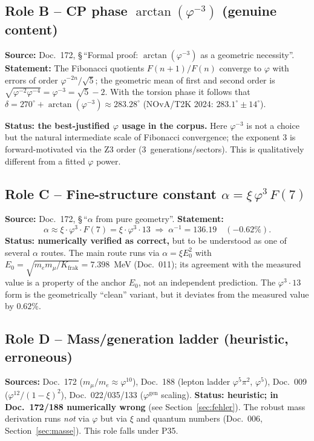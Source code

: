 \subsection{Role B -- CP phase $\arctan(\varphi^{-3})$ (genuine content)}
\textbf{Source:} Doc.~172, \S\,``Formal proof: $\arctan(\varphi^{-3})$ as a
geometric necessity''. \textbf{Statement:} The Fibonacci quotients
$F(n{+}1)/F(n)$ converge to $\varphi$ with errors of order
$\varphi^{-2n}/\sqrt5$; the geometric mean of first and second order is
$\sqrt{\varphi^{-2}\varphi^{-4}}=\varphi^{-3}=\sqrt5-2$. With the torsion
phase it follows that
$\delta = 270^\circ + \arctan(\varphi^{-3}) \approx 283.28^\circ$
(NOvA/T2K 2024: $283.1^\circ\pm14^\circ$).
\begin{correct}
\textbf{Status: the best-justified $\varphi$ usage in the corpus.} Here
$\varphi^{-3}$ is not a choice but the natural intermediate scale of Fibonacci
convergence; the exponent $3$ is forward-motivated via the Z3 order
($3$~generations/sectors). This is qualitatively different from a fitted
$\varphi$ power.
\end{correct}

\subsection{Role C -- Fine-structure constant $\alpha=\xi\,\varphi^3\,F(7)$}
\textbf{Source:} Doc.~172, \S\,``$\alpha$ from pure geometry''.
\textbf{Statement:}
\begin{equation}
  \alpha \approx \xi\cdot\varphi^3\cdot F(7) = \xi\cdot\varphi^3\cdot 13
  \;\Rightarrow\; \alpha^{-1} = 136.19 \quad(-0.62\%).
\end{equation}
\textbf{Status: numerically verified as correct,} but to be understood as one
of several $\alpha$ routes. The main route runs via
$\alpha=\xi E_0^2$ with $E_0=\sqrt{m_e m_\mu/K_{\text{frak}}}=7.398$~MeV (Doc.~011); its agreement with the measured value is a property of the anchor $E_0$, not an independent prediction. The $\varphi^3\cdot13$ form is the
geometrically ``clean'' variant, but it deviates from the measured value by
$0.62\%$.

\subsection{Role D -- Mass/generation ladder (heuristic, erroneous)}
\textbf{Sources:} Doc.~172 ($m_\mu/m_e\approx\varphi^{10}$),
Doc.~188 (lepton ladder $\varphi^5\pi^2$, $\varphi^5$), Doc.~009
($\varphi^{12}/(1-\xi)^2$), Doc.~022/035/133 ($\varphi^{\text{gen}}$ scaling).
\textbf{Status: heuristic; in Doc.~172/188 numerically wrong} (see
Section~\ref{sec:fehler}). The robust mass derivation runs \emph{not} via
$\varphi$ but via $\xi$ and quantum numbers (Doc.~006,
Section~\ref{sec:masse}). This role falls under P35.

